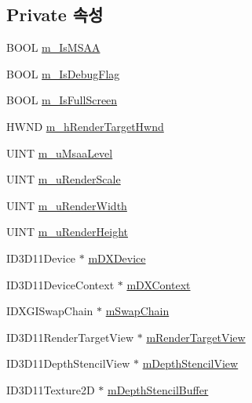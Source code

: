 \subsection*{Private 속성}
\begin{DoxyCompactItemize}
\item 
B\+O\+OL \hyperlink{class_comet_engine_1_1_renderer_1_1_comet_engine_d_x_renderer_ade12531fe5dd3f80e38d0baf16fe2c3f}{m\+\_\+\+Is\+M\+S\+AA}
\item 
B\+O\+OL \hyperlink{class_comet_engine_1_1_renderer_1_1_comet_engine_d_x_renderer_a4605315a46596f062351adb5071a334c}{m\+\_\+\+Is\+Debug\+Flag}
\item 
B\+O\+OL \hyperlink{class_comet_engine_1_1_renderer_1_1_comet_engine_d_x_renderer_aa6179af78a783f7c0d77d6ea9b95abfb}{m\+\_\+\+Is\+Full\+Screen}
\item 
H\+W\+ND \hyperlink{class_comet_engine_1_1_renderer_1_1_comet_engine_d_x_renderer_a6ec5b124115c13d09e631e3245ba0264}{m\+\_\+h\+Render\+Target\+Hwnd}
\item 
U\+I\+NT \hyperlink{class_comet_engine_1_1_renderer_1_1_comet_engine_d_x_renderer_aee26a00f9adfbcf0a5de3a91ec7e322d}{m\+\_\+u\+Msaa\+Level}
\item 
U\+I\+NT \hyperlink{class_comet_engine_1_1_renderer_1_1_comet_engine_d_x_renderer_a00acfc4bfe2d732584f5ae0cb28186d8}{m\+\_\+u\+Render\+Scale}
\item 
U\+I\+NT \hyperlink{class_comet_engine_1_1_renderer_1_1_comet_engine_d_x_renderer_a3127a8dc19e4bd799fa7e1bfff28de11}{m\+\_\+u\+Render\+Width}
\item 
U\+I\+NT \hyperlink{class_comet_engine_1_1_renderer_1_1_comet_engine_d_x_renderer_af8f780a50f9325d3bad66c1ba49ed533}{m\+\_\+u\+Render\+Height}
\item 
I\+D3\+D11\+Device $\ast$ \hyperlink{class_comet_engine_1_1_renderer_1_1_comet_engine_d_x_renderer_ac606b85554250d2e65a2aa9f10e6aa45}{m\+D\+X\+Device}
\item 
I\+D3\+D11\+Device\+Context $\ast$ \hyperlink{class_comet_engine_1_1_renderer_1_1_comet_engine_d_x_renderer_ad38b8ad7fd1c747698a96256e75eb635}{m\+D\+X\+Context}
\item 
I\+D\+X\+G\+I\+Swap\+Chain $\ast$ \hyperlink{class_comet_engine_1_1_renderer_1_1_comet_engine_d_x_renderer_a501ef6e0fe112727e82e727997af01c6}{m\+Swap\+Chain}
\item 
I\+D3\+D11\+Render\+Target\+View $\ast$ \hyperlink{class_comet_engine_1_1_renderer_1_1_comet_engine_d_x_renderer_a109e138c97280440a0955d475441f49d}{m\+Render\+Target\+View}
\item 
I\+D3\+D11\+Depth\+Stencil\+View $\ast$ \hyperlink{class_comet_engine_1_1_renderer_1_1_comet_engine_d_x_renderer_a01cc1c2c77d9af90d45c250d51bcfa35}{m\+Depth\+Stencil\+View}
\item 
I\+D3\+D11\+Texture2D $\ast$ \hyperlink{class_comet_engine_1_1_renderer_1_1_comet_engine_d_x_renderer_a738b786f64e4fc6c9a2355f1cf9ae830}{m\+Depth\+Stencil\+Buffer}
\end{DoxyCompactItemize}
